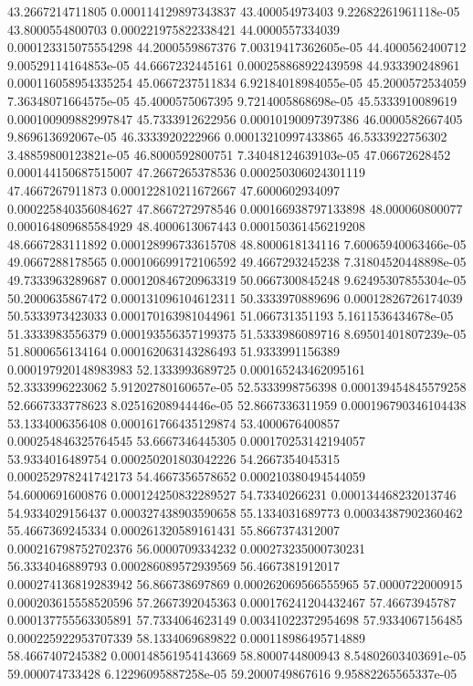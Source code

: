 {43.2667214711805 0.000114129897343837
43.400054973403 9.22682261961118e-05
43.8000554800703 0.000221975822338421
44.0000557334039 0.000123315075554298
44.2000559867376 7.00319417362605e-05
44.4000562400712 9.00529114164853e-05
44.6667232445161 0.000258868922439598
44.933390248961 0.000116058954335254
45.0667237511834 6.92184018984055e-05
45.2000572534059 7.36348071664575e-05
45.4000575067395 9.7214005868698e-05
45.5333910089619 0.000100909882997847
45.7333912622956 0.00010190097397386
46.0000582667405 9.869613692067e-05
46.3333920222966 0.00013210997433865
46.5333922756302 3.48859800123821e-05
46.8000592800751 7.34048124639103e-05
47.06672628452 0.000144150687515007
47.2667265378536 0.000250306024301119
47.4667267911873 0.000122810211672667
47.6000602934097 0.000225840356084627
47.8667272978546 0.000166938797133898
48.000060800077 0.000164809685584929
48.4000613067443 0.000150361456219208
48.6667283111892 0.000128996733615708
48.8000618134116 7.60065940063466e-05
49.0667288178565 0.000106699172106592
49.4667293245238 7.31804520448898e-05
49.7333963289687 0.000120846720963319
50.0667300845248 9.62495307855304e-05
50.2000635867472 0.000131096104612311
50.3333970889696 0.00012826726174039
50.5333973423033 0.000170163981044961
51.066731351193 5.1611536434678e-05
51.3333983556379 0.000193556357199375
51.5333986089716 8.69501401807239e-05
51.8000656134164 0.000162063143286493
51.9333991156389 0.000197920148983983
52.1333993689725 0.000165243462095161
52.3333996223062 5.91202780160657e-05
52.5333998756398 0.000139454845579258
52.6667333778623 8.02516208944446e-05
52.8667336311959 0.000196790346104438
53.1334006356408 0.000161766435129874
53.4000676400857 0.000254846325764545
53.6667346445305 0.000170253142194057
53.9334016489754 0.000250201803042226
54.2667354045315 0.000252978241742173
54.4667356578652 0.000210380494544059
54.6000691600876 0.000124250832289527
54.73340266231 0.000134468232013746
54.9334029156437 0.000327438903590658
55.1334031689773 0.00034387902360462
55.4667369245334 0.000261320589161431
55.8667374312007 0.000216798752702376
56.0000709334232 0.000273235000730231
56.3334046889793 0.000286089572939569
56.4667381912017 0.000274136819283942
56.866738697869 0.000262069566555965
57.0000722000915 0.000203615558520596
57.2667392045363 0.000176241204432467
57.46673945787 0.000137755563305891
57.7334064623149 0.00341022372954698
57.9334067156485 0.000225922953707339
58.1334069689822 0.000118986495714889
58.4667407245382 0.000148561954143669
58.8000744800943 8.54802603403691e-05
59.000074733428 6.12296095887258e-05
59.2000749867616 9.95882265565337e-05
}
